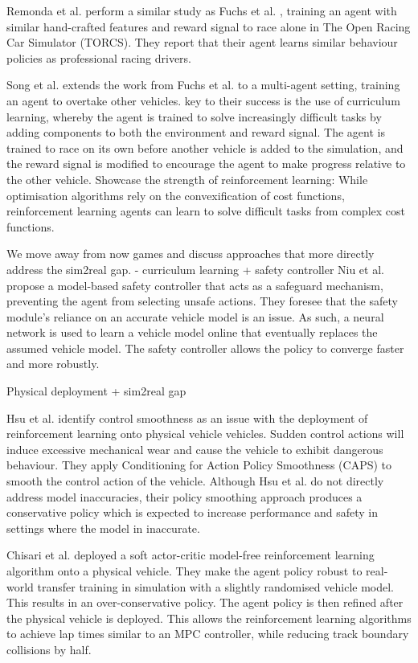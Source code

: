 Remonda et al. \cite{Remonda2021} perform a similar study as Fuchs et al. \cite{Fuchs2021}, training an agent with similar hand-crafted features and reward signal to race alone in The Open Racing Car Simulator (TORCS). They report that their agent learns similar behaviour policies as professional racing drivers.

\cite{Song2021}
Song et al. \cite{Song2021} extends the work from Fuchs et al. \cite{Fuchs2021} to a multi-agent setting, training an agent to overtake other vehicles.
key to their success is the use of curriculum learning, whereby the agent is trained to solve increasingly difficult tasks by adding components to both the environment and reward signal. 
The agent is trained to race on its own before another vehicle is added to the simulation, and the reward signal is modified to encourage the agent to make progress relative to the other vehicle.
Showcase the strength of reinforcement learning: While optimisation algorithms rely on the convexification of cost functions, reinforcement learning agents can learn to solve difficult tasks from complex cost functions.

We move away from now games and discuss approaches that more directly address the sim2real gap.
\cite{Niu2020} - curriculum learning + safety controller
Niu et al. \cite{Niu2020} propose a model-based safety controller that acts as a safeguard mechanism, preventing the agent from selecting unsafe actions.
They foresee that the safety module's reliance on an accurate vehicle model is an issue. 
As such, a neural network is used to learn a vehicle model online that eventually replaces the assumed vehicle model.
The safety controller allows the policy to converge faster and more robustly.



Physical deployment + sim2real gap

\cite{hsu2022}
Hsu et al. \cite{hsu2022} identify control smoothness as an issue with the deployment of reinforcement learning onto physical vehicle vehicles. 
Sudden control actions will induce excessive mechanical wear and cause the vehicle to exhibit dangerous behaviour.
They apply Conditioning for Action Policy Smoothness (CAPS) to smooth the control action of the vehicle.
Although Hsu et al. \cite{hsu2022} do not directly address model inaccuracies, their policy smoothing approach produces a conservative policy which is expected to increase performance and safety in settings where the model in inaccurate.


\cite{Chisari2021}
Chisari et al. \cite{Chisari2021} deployed a soft actor-critic model-free reinforcement learning algorithm onto a physical vehicle.
They make the agent policy robust to real-world transfer training in simulation with a slightly randomised vehicle model.
This results in an over-conservative policy.
The agent policy is then refined after the physical vehicle is deployed.
This allows the reinforcement learning algorithms to achieve lap times similar to an MPC controller, while reducing track boundary collisions by half.

